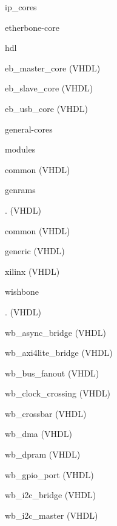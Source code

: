 \begin{dig}
\item ip\_cores
    \begin{dig}
    \item etherbone-core
        \begin{dig}
        \item hdl
            \begin{dig}
            \item eb\_master\_core (VHDL)
            \item eb\_slave\_core (VHDL)
            \item eb\_usb\_core (VHDL)
            \end{dig}
        \end{dig}
    \item general-cores
        \begin{dig}
        \item modules
            \begin{dig}
            \item common (VHDL)
            \item genrams
                \begin{dig}
                \item . (VHDL)
                \item common (VHDL)
                \item generic (VHDL)
                \item xilinx (VHDL)
                \end{dig}
            \item wishbone
                \begin{dig}
                \item . (VHDL)
                \item wb\_async\_bridge (VHDL)
                \item wb\_axi4lite\_bridge (VHDL)
                \item wb\_bus\_fanout (VHDL)
                \item wb\_clock\_crossing (VHDL)
                \item wb\_crossbar (VHDL)
                \item wb\_dma (VHDL)
                \item wb\_dpram (VHDL)
                \item wb\_gpio\_port (VHDL)
                \item wb\_i2c\_bridge (VHDL)
                \item wb\_i2c\_master (VHDL)

\end{dig}
\end{dig}
\end{dig}
\end{dig}
\end{dig}
